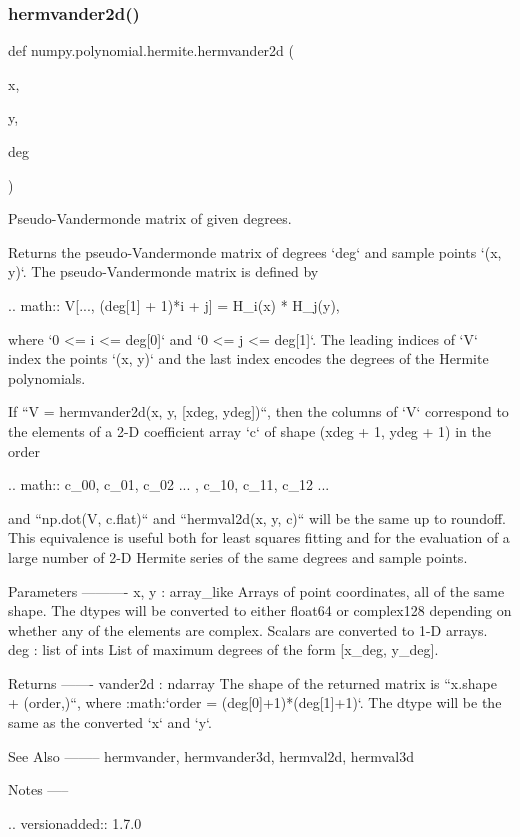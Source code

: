 \subsubsection{\texorpdfstring{hermvander2d()}{hermvander2d()}}
{\footnotesize\ttfamily def numpy.\+polynomial.\+hermite.\+hermvander2d (\begin{DoxyParamCaption}\item[{}]{x,  }\item[{}]{y,  }\item[{}]{deg }\end{DoxyParamCaption})}

\begin{DoxyVerb}Pseudo-Vandermonde matrix of given degrees.

Returns the pseudo-Vandermonde matrix of degrees `deg` and sample
points `(x, y)`. The pseudo-Vandermonde matrix is defined by

.. math:: V[..., (deg[1] + 1)*i + j] = H_i(x) * H_j(y),

where `0 <= i <= deg[0]` and `0 <= j <= deg[1]`. The leading indices of
`V` index the points `(x, y)` and the last index encodes the degrees of
the Hermite polynomials.

If ``V = hermvander2d(x, y, [xdeg, ydeg])``, then the columns of `V`
correspond to the elements of a 2-D coefficient array `c` of shape
(xdeg + 1, ydeg + 1) in the order

.. math:: c_{00}, c_{01}, c_{02} ... , c_{10}, c_{11}, c_{12} ...

and ``np.dot(V, c.flat)`` and ``hermval2d(x, y, c)`` will be the same
up to roundoff. This equivalence is useful both for least squares
fitting and for the evaluation of a large number of 2-D Hermite
series of the same degrees and sample points.

Parameters
----------
x, y : array_like
    Arrays of point coordinates, all of the same shape. The dtypes
    will be converted to either float64 or complex128 depending on
    whether any of the elements are complex. Scalars are converted to 1-D
    arrays.
deg : list of ints
    List of maximum degrees of the form [x_deg, y_deg].

Returns
-------
vander2d : ndarray
    The shape of the returned matrix is ``x.shape + (order,)``, where
    :math:`order = (deg[0]+1)*(deg[1]+1)`.  The dtype will be the same
    as the converted `x` and `y`.

See Also
--------
hermvander, hermvander3d, hermval2d, hermval3d

Notes
-----

.. versionadded:: 1.7.0\end{DoxyVerb}
 \mbox{\label{namespacenumpy_1_1polynomial_1_1hermite_aaa1c41cb6e83dda4459be6b5a51f4eda}} 
